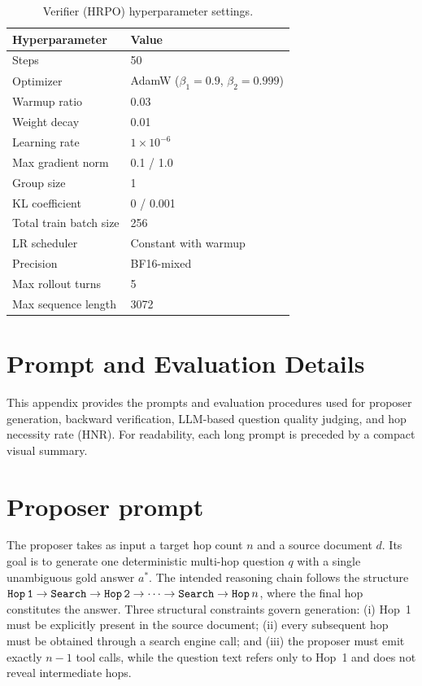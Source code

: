 \documentclass{article}
\begin{document}
\begin{table}[h]
\centering
\caption{Verifier (HRPO) hyperparameter settings.}
\label{tab:verifier_hp}
\small
\begin{tabular}{ll}
\toprule
\textbf{Hyperparameter} & \textbf{Value} \\
\midrule
Steps & 50 \\
Optimizer & AdamW ($\beta_1{=}0.9$, $\beta_2{=}0.999$) \\
Warmup ratio & 0.03 \\
Weight decay & 0.01 \\
Learning rate & $1\times10^{-6}$ \\
Max gradient norm & 0.1 / 1.0 \\
Group size & 1 \\
KL coefficient & 0 / 0.001 \\
Total train batch size & 256 \\
LR scheduler & Constant with warmup \\
Precision & BF16-mixed \\
Max rollout turns & 5 \\
Max sequence length & 3072 \\
\bottomrule
\end{tabular}
\end{table}

\section{Prompt and Evaluation Details}

This appendix provides the prompts and evaluation procedures used for proposer
generation, backward verification, LLM-based question quality judging, and hop
necessity rate (HNR). For readability, each long prompt is preceded by a compact
visual summary.

\section{Proposer prompt}
\label{app:proposer_prompt}

The proposer takes as input a target hop count $n$ and a source document $d$.
Its goal is to generate one deterministic multi-hop question $q$ with a single unambiguous gold answer $a^\ast$.
The intended reasoning chain follows the structure $\texttt{Hop\,1} \to \texttt{Search} \to \texttt{Hop\,2} \to \cdots \to \texttt{Search} \to \texttt{Hop\,}n$, where the final hop constitutes the answer.
Three structural constraints govern generation:
(i) Hop~1 must be explicitly present in the source document;
(ii) every subsequent hop must be obtained through a search engine call; and
(iii) the proposer must emit exactly $n-1$ tool calls, while the question text refers only to Hop~1 and does not reveal intermediate hops.
\end{document}
